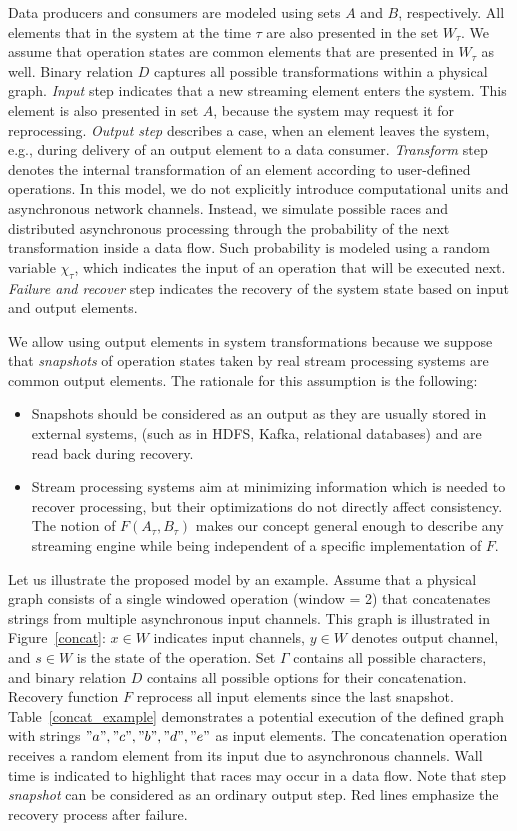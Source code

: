 Data producers and consumers are modeled using sets $A$ and $B$, respectively. All elements that in the system at the time $\tau$ are also presented in the set $W_\tau$. We assume that operation states are common elements that are presented in $W_\tau$ as well. Binary relation $D$ captures all possible transformations within a physical graph. {\em Input} step indicates that a new streaming element enters the system. This element is also presented in set $A$, because the system may request it for reprocessing. {\em Output step} describes a case, when an element leaves the system, e.g., during delivery of an output element to a data consumer. {\em Transform} step denotes the internal transformation of an element according to user-defined operations. In this model, we do not explicitly introduce computational units and asynchronous network channels. Instead, we simulate possible races and distributed asynchronous processing through the probability of the next transformation inside a data flow. Such probability is modeled using a random variable $\chi_\tau$, which indicates the input of an operation that will be executed next. {\em Failure and recover} step indicates the recovery of the system state based on input and output elements.

We allow using output elements in system transformations because we suppose that {\em snapshots} of operation states taken by real stream processing systems are common output elements. The rationale for this assumption is the following:

\begin{itemize}
    \item Snapshots should be considered as an output as they are usually stored in external systems, (such as in HDFS, Kafka, relational databases)   and are read back during recovery. 
    \item Stream processing systems aim at minimizing information which is needed to recover processing, but their optimizations do not directly affect consistency. The notion of $F(A_\tau, B_\tau)$ makes our concept general enough to describe any streaming engine while being independent of a specific implementation of $F$.
\end{itemize}

Let us illustrate the proposed model by an example. Assume that a physical graph consists of a single windowed operation (window = 2) that concatenates strings from multiple asynchronous input channels. This graph is illustrated in Figure~\ref{concat}: $x \in W$ indicates input channels, $y\in W$ denotes output channel, and $ s \in W$ is the state of the operation. Set $\Gamma$ contains all possible characters, and binary relation $D$ contains all possible options for their concatenation. Recovery function $F$ reprocess all input elements since the last snapshot. Table~\ref{concat_example} demonstrates a potential execution of the defined graph with strings $"a","c","b","d","e"$ as input elements. The concatenation operation receives a random element from its input due to asynchronous channels. Wall time is indicated to highlight that races may occur in a data flow. Note that step {\em snapshot} can be considered as an ordinary output step. Red lines emphasize the recovery process after failure. 

